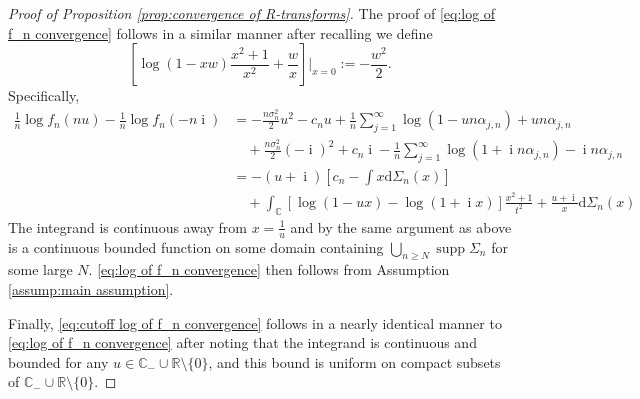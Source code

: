 \documentclass[reqno]{amsart}
\newcommand{\1}{\mathbf{1}}
\DeclareMathOperator{\supp}{supp}
\newcommand{\dd}{\mathrm{d}}
\DeclareMathOperator{\ii}{i}
\newcommand{\C}{\mathbb{C}}
\newcommand{\R}{\mathbb{R}}
\def\R{\mathbb{R}}
\theoremstyle{plain}
\theoremstyle{definition}
\theoremstyle{remark}
\numberwithin{equation}{section}
\begin{document}
\begin{proof}[Proof of Proposition \ref{prop:convergence of R-transforms}]
	The proof of \eqref{eq:log of f_n convergence} follows in a similar manner after recalling we define $$\left[ \log(1-xw)\frac{x^2+1}{x^2}+\frac{w}{x}\right]\Big|_{x=0}:=-\frac{w^2}{2}.$$ Specifically, \begin{equation}
		\begin{aligned}
			\frac{1}{n}\log f_n(nu)-\frac{1}{n}\log f_{n}(-n\ii)&=-\frac{n\sigma_n^2}{2}u^2-c_nu+\frac{1}{n}\sum_{j=1}^{\infty}\log\left(1-un\alpha_{j,n}\right)+un\alpha_{j,n}\\
			&\quad+\frac{n\sigma_n^2}{2}(-\ii)^2+c_n\ii-\frac{1}{n}\sum_{j=1}^{\infty}\log\left(1+\ii n\alpha_{j,n}\right)-\ii n\alpha_{j,n}\\
			&=-(u+\ii)\left[c_n-\int x\dd\Sigma_{n}(x)\right]\\
			&\quad +\int_{\C}\left[\log(1-ux)-\log(1+\ii x)\right]\frac{x^2+1}{t^2}+\frac{u+\ii}{x}\dd\Sigma_{n}(x)
		\end{aligned}
	\end{equation} The integrand is continuous away from $x=\frac{1}{u}$ and by the same argument as above is  a continuous bounded function on some domain containing $\bigcup_{n\geq N}\supp\Sigma_{n}$ for some large $N$. \eqref{eq:log of f_n convergence} then follows from Assumption \ref{assump:main assumption}.
	
	Finally, \eqref{eq:cutoff log of f_n convergence} follows in a nearly identical manner to \eqref{eq:log of f_n convergence} after noting that the integrand is continuous and bounded for any $u\in\C_-\cup\R\setminus\{0\}$, and this bound is uniform on compact subsets of $\C_-\cup\R\setminus\{0\}$. 
\end{proof}
\end{document}
